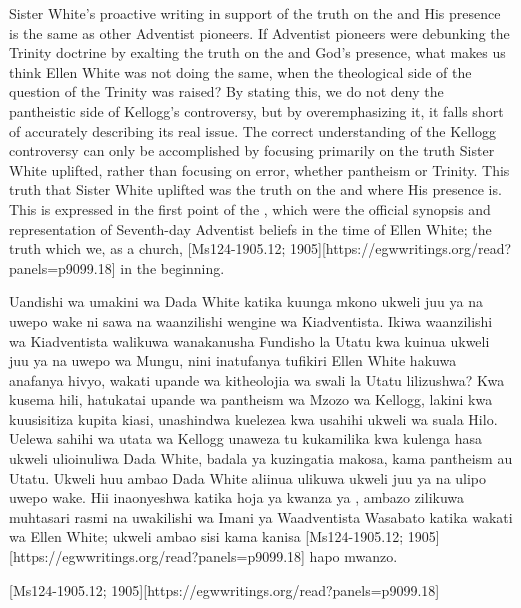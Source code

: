 Sister White’s proactive writing in support of the truth on the  and His presence is the same as other Adventist pioneers. If Adventist pioneers were debunking the Trinity doctrine by exalting the truth on the  and God’s presence, what makes us think Ellen White was not doing the same, when the theological side of the question of the Trinity was raised? By stating this, we do not deny the pantheistic side of Kellogg’s controversy, but by overemphasizing it, it falls short of accurately describing its real issue. The correct understanding of the Kellogg controversy can only be accomplished by focusing primarily on the truth Sister White uplifted, rather than focusing on error, whether pantheism or Trinity. This truth that Sister White uplifted was the truth on the  and where His presence is. This is expressed in the first point of the , which were the official synopsis and representation of Seventh-day Adventist beliefs in the time of Ellen White; the truth which we, as a church, [Ms124-1905.12; 1905][https://egwwritings.org/read?panels=p9099.18] in the beginning.


Uandishi wa umakini wa Dada White katika kuunga mkono ukweli juu ya  na uwepo wake ni sawa na waanzilishi wengine wa Kiadventista. Ikiwa waanzilishi wa Kiadventista walikuwa wanakanusha Fundisho la Utatu kwa kuinua ukweli juu ya  na uwepo wa Mungu, nini inatufanya tufikiri Ellen White hakuwa anafanya hivyo, wakati upande wa kitheolojia wa swali la Utatu lilizushwa? Kwa kusema hili, hatukatai upande wa pantheism wa Mzozo wa Kellogg, lakini kwa kuusisitiza kupita kiasi, unashindwa kuelezea kwa usahihi ukweli wa suala Hilo. Uelewa sahihi wa utata wa Kellogg unaweza tu kukamilika kwa kulenga hasa ukweli ulioinuliwa Dada White, badala ya kuzingatia makosa, kama pantheism au Utatu. Ukweli huu ambao Dada White aliinua ulikuwa ukweli juu ya  na ulipo uwepo wake. Hii inaonyeshwa katika hoja ya kwanza ya , ambazo zilikuwa muhtasari rasmi na uwakilishi wa Imani ya Waadventista Wasabato katika wakati wa Ellen White; ukweli ambao sisi kama kanisa [Ms124-1905.12; 1905][https://egwwritings.org/read?panels=p9099.18] hapo mwanzo.


[Ms124-1905.12; 1905][https://egwwritings.org/read?panels=p9099.18]


